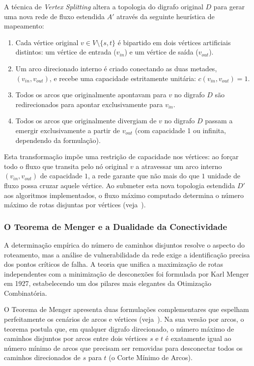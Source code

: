 \documentclass[12pt,a4paper]{article}
\begin{document}
A técnica de \textit{Vertex Splitting} altera a topologia do digrafo original $D$ para gerar uma nova rede de fluxo estendida $A'$ através da seguinte heurística de mapeamento:
\begin{enumerate}
    \item Cada vértice original $v \in V \setminus \{s, t\}$ é bipartido em dois vértices artificiais distintos: um vértice de entrada ($v_{in}$) e um vértice de saída ($v_{out}$).
    \item Um arco direcionado interno é criado conectando as duas metades, $(v_{in}, v_{out})$, e recebe uma capacidade estritamente unitária: $c(v_{in}, v_{out}) = 1$.
    \item Todos os arcos que originalmente apontavam para $v$ no digrafo $D$ são redirecionados para apontar exclusivamente para $v_{in}$.
    \item Todos os arcos que originalmente divergiam de $v$ no digrafo $D$ passam a emergir exclusivamente a partir de $v_{out}$ (com capacidade 1 ou infinita, dependendo da formulação).
\end{enumerate}

Esta transformação impõe uma restrição de capacidade nos vértices: ao forçar todo o fluxo que transita pelo nó original $v$ a atravessar um arco interno $(v_{in}, v_{out})$ de capacidade $1$, a rede garante que não mais do que $1$ unidade de fluxo possa cruzar aquele vértice. Ao submeter esta nova topologia estendida $D'$ aos algoritmos implementados, o fluxo máximo computado determina o número máximo de rotas disjuntas por vértices (veja~\cite{korte2018combinatorial}).

\subsubsection{O Teorema de Menger e a Dualidade da Conectividade}

A determinação empírica do número de caminhos disjuntos resolve o aspecto do roteamento, mas a análise de vulnerabilidade da rede exige a identificação precisa dos pontos críticos de falha. A teoria que unifica a maximização de rotas independentes com a minimização de desconexões foi formulada por Karl Menger em 1927, estabelecendo um dos pilares mais elegantes da Otimização Combinatória.

O Teorema de Menger apresenta duas formulações complementares que espelham perfeitamente os cenários de arcos e vértices (veja~\cite{cook1998combinatorial}). Na sua versão por arcos, o teorema postula que, em qualquer digrafo direcionado, o número máximo de caminhos disjuntos por arcos entre dois vértices $s$ e $t$ é exatamente igual ao número mínimo de arcos que precisam ser removidas para desconectar todos os caminhos direcionados de $s$ para $t$ (o Corte Mínimo de Arcos).
\end{document}
